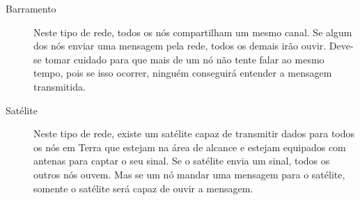 \begin{description}
			\begin{description}
				\item[Barramento] Neste tipo de rede, todos os nós compartilham um mesmo canal. Se algum dos nós enviar uma mensagem pela rede, todos os demais irão ouvir. Deve-se tomar cuidado para que mais de um nó não tente falar ao mesmo tempo, pois se isso ocorrer, ninguém conseguirá entender a mensagem transmitida.
				\item[Satélite] Neste tipo de rede, existe um satélite capaz de transmitir dados para todos os nós em Terra que estejam na área de alcance e estejam equipados com antenas para captar o seu sinal. Se o satélite envia um sinal, todos os outros nós ouvem. Mas se um nó mandar uma mensagem para o satélite, somente o satélite será capaz de ouvir a mensagem.
			\end{description}
		
	\end{description}

















